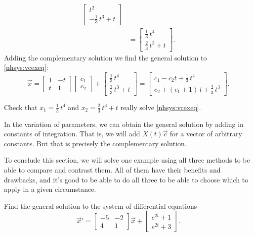 \begin{exampleSol}
\begin{equation*}
\begin{split}
\begin{bmatrix}
t^2 \\
-\frac{1}{3}\,t^3 + t
\end{bmatrix} 
\\
& =
\begin{bmatrix}
\frac{1}{3}\,t^4 \\
\frac{2}{3}\,t^3 + t
\end{bmatrix}  .
\end{split}
\end{equation*}
Adding the complementary solution we find the general solution
to \eqref{nhsys:vcexeq}:
\begin{equation*}
\vec{x} =
\begin{bmatrix}
1 & -t \\
t & 1
\end{bmatrix}
\begin{bmatrix}
c_1 \\ c_2
\end{bmatrix}
+
\begin{bmatrix}
\frac{1}{3}\,t^4 \\
\frac{2}{3}\,t^3 + t
\end{bmatrix}
=
\begin{bmatrix}
c_1 - c_2 t
+
\frac{1}{3}\,t^4 \\
c_2 + 
(c_1 + 1)\, t
+
\frac{2}{3}\,t^3
\end{bmatrix} .
\end{equation*}
\end{exampleSol}

\begin{exercise}
Check that $x_1 = 
\frac{1}{3}\,t^4$ and $x_2 = 
\frac{2}{3}\,t^3 + t$ really solve
\eqref{nhsys:vcexeq}.
\end{exercise}

In the variation of parameters, %
we can obtain the general solution by adding in constants of integration.
That is, we will add $X(t) \vec{c}$ for a vector of arbitrary constants.  But
that is precisely the complementary solution.

To conclude this section, we will solve one example using all three methods to be able to compare and contrast them. All of them have their benefits and drawbacks, and it's good to be able to do all three to be able to choose which to apply in a given circumstance.

\begin{example}
Find the general solution to the system of differential equations
\begin{equation*}
\vec{x}' = \begin{bmatrix} -5 & -2 \\ 4 & 1 \end{bmatrix} \vec{x} + \begin{bmatrix} e^{2t} + 1 \\ e^{2t} + 3 \end{bmatrix} .
\end{equation*}
\end{example}

